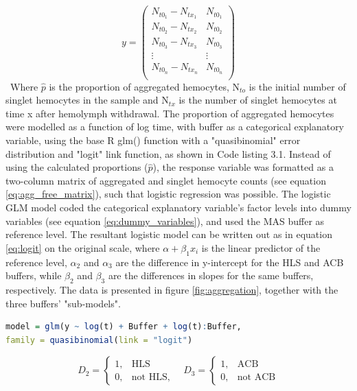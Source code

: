 \begin{equation}
    \label{eq:agg_free_matrix}
    y = 
    \begin{pmatrix}
      N_{t0_{1}} - N_{tx_{1}} &  N_{t0_{1}} \\
      N_{t0_{2}} - N_{tx_{2}} &  N_{t0_{2}} \\
      N_{t0_{3}} - N_{tx_{3}} &  N_{t0_{3}} \\
      \vdots                   & \vdots       \\
      N_{t0_{n}} - N_{tx_{n}} &  N_{t0_{n}} \\
    \end{pmatrix}
\end{equation}
\
Where $\hat{p}$ is the proportion of aggregated hemocytes, N$_{to}$ is the initial number of singlet hemocytes in the sample and N$_{tx}$ is the number of singlet hemocytes at time x after hemolymph withdrawal. The proportion of aggregated hemocytes were modelled as a function of log time, with buffer as a categorical explanatory variable, using the base R glm() function with a "quasibinomial" error distribution and "logit" link function, as shown in Code listing 3.1. Instead of using the calculated proportions ($\hat{p}$), the response variable was formatted as a two-column matrix of aggregated and singlet hemocyte counts (see equation \ref{eq:agg_free_matrix}), such that logistic regression was possible. The logistic GLM model coded the categorical explanatory variable's factor levels into dummy variables (see equation \ref{eq:dummy_variables}), and used the MAS buffer as reference level. The resultant logistic model can be written out as in equation \ref{eq:logit} on the original scale, where $\alpha + \beta_{1}x_{i}$ is the linear predictor of the reference level, $\alpha_{2}$ and $\alpha_{3}$ are the difference in y-intercept for the HLS and ACB buffers, while $\beta_{2}$ and $\beta_{3}$ are the differences in slopes for the same buffers, respectively. The data is presented in figure \ref{fig:aggregation}, together with the three buffers' "sub-models".

\begin{lstlisting}[language=R, caption = {The R source code run to fit the logistic proportion aggregation model.}]
model = glm(y ~ log(t) + Buffer + log(t):Buffer,
family = quasibinomial(link = "logit")
\end{lstlisting}

\begin{equation}
    \label{eq:dummy_variables}
D_{2} =\begin{cases}
      1, & \text{HLS}\\
      0, & \text{not HLS},
    \end{cases}
    \quad
D_{3} =\begin{cases}
      1, & \text{ACB}\\
      0, & \text{not ACB}
    \end{cases}
\end{equation}

